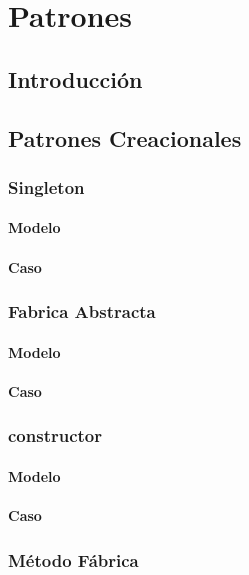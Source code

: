 \chapter{Patrones}

\section{Introducción}

\section{Patrones Creacionales}

\subsection{Singleton}
\subsubsection{Modelo}
\newpage
\subsubsection{Caso}
\newpage


\subsection{Fabrica Abstracta}
\subsubsection{Modelo}
\newpage
\subsubsection{Caso}
\newpage


\subsection{constructor}
\subsubsection{Modelo}
\newpage
\subsubsection{Caso}
\newpage

\subsection{Método Fábrica}
